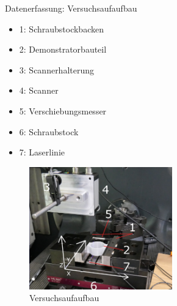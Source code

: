 \documentclass[../slides.tex]{subfiles}
\begin{document}
\begin{frame}{Datenerfassung: Versuchsaufaufbau}
    \begin{minipage}[t]{.3\textwidth}
        \begin{itemize}
            \item 1: Schraubstockbacken
            \item 2: Demonstratorbauteil
            \item 3: Scannerhalterung
            \item 4: Scanner
            \item 5: Verschiebungsmesser
            \item 6: Schraubstock
            \item 7: Laserlinie
        \end{itemize}
        \end{minipage}
        \hfill
        \begin{minipage}[t]{.65\textwidth}
        \begin{figure}[]
            \includegraphics[height=150pt]{img_niklas/versuchsaufbau_foto.png.JPG}
            \caption{Versuchsaufaufbau}
            \label{fig:versuchsaufbau}
        \end{figure}
        \end{minipage}
\end{frame}
\end{document}
